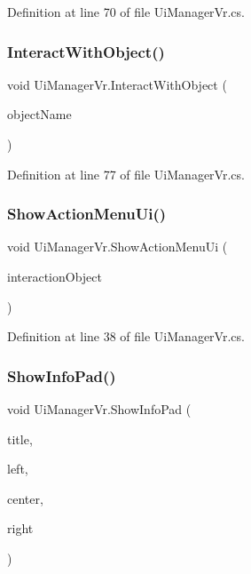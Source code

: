 Definition at line 70 of file Ui\+Manager\+Vr.\+cs.

\mbox{\label{class_ui_manager_vr_aa12b63c05a476d09ac42ad93da298af0}} 
\subsubsection{\texorpdfstring{InteractWithObject()}{InteractWithObject()}}
{\footnotesize\ttfamily void Ui\+Manager\+Vr.\+Interact\+With\+Object (\begin{DoxyParamCaption}\item[{string}]{object\+Name }\end{DoxyParamCaption})}



Definition at line 77 of file Ui\+Manager\+Vr.\+cs.

\mbox{\label{class_ui_manager_vr_a6525aa6d75dfa7d978ef5186d73c96b7}} 
\subsubsection{\texorpdfstring{ShowActionMenuUi()}{ShowActionMenuUi()}}
{\footnotesize\ttfamily void Ui\+Manager\+Vr.\+Show\+Action\+Menu\+Ui (\begin{DoxyParamCaption}\item[{\mbox{\hyperlink{class_interaction_object}{Interaction\+Object}}}]{interaction\+Object }\end{DoxyParamCaption})}



Definition at line 38 of file Ui\+Manager\+Vr.\+cs.

\mbox{\label{class_ui_manager_vr_afa2445911343a9737745c3fb0151d133}} 
\subsubsection{\texorpdfstring{ShowInfoPad()}{ShowInfoPad()}}
{\footnotesize\ttfamily void Ui\+Manager\+Vr.\+Show\+Info\+Pad (\begin{DoxyParamCaption}\item[{string}]{title,  }\item[{string}]{left,  }\item[{string}]{center,  }\item[{string}]{right }\end{DoxyParamCaption})}



